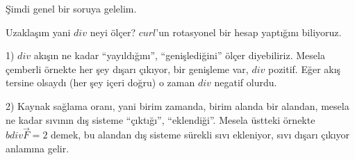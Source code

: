 \documentclass[12pt,fleqn]{article}\usepackage{../../common}
\begin{document}
Şimdi genel bir soruya gelelim. 

Uzaklaşım yani $div$ neyi ölçer? $curl$'un rotasyonel bir hesap yaptığını
biliyoruz. 

1) $div$ akışın ne kadar ``yayıldığını'', ``genişlediğini'' ölçer
diyebiliriz. Mesela çemberli örnekte her şey dışarı çıkıyor, bir genişleme
var, $div$ pozitif. Eğer akış tersine olsaydı (her şey içeri doğru) o zaman
$div$ negatif olurdu. 

2) Kaynak sağlama oranı, yani birim zamanda, birim alanda bir alandan,
mesela ne kadar sıvının dış sisteme ``çıktığı'', ``eklendiği''. Mesela
üstteki örnekte $bdiv \vec{F} = 2$ demek, bu alandan dış sisteme sürekli
sıvı ekleniyor, sıvı dışarı çıkıyor anlamına gelir.
\end{document}
